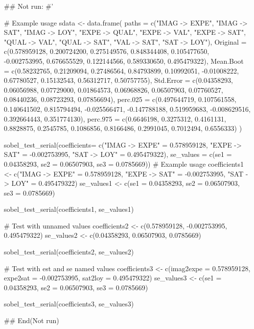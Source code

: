 \documentclass[a4paper]{book}
\begin{document}
\begin{Examples}
\begin{ExampleCode}

## Not run: 
#'

# Example usage
sdata <- data.frame(
  paths = c("IMAG -> EXPE", "IMAG -> SAT",
              "IMAG -> LOY", "EXPE -> QUAL", "EXPE -> VAL", "EXPE -> SAT",
            "QUAL -> VAL", "QUAL -> SAT", "VAL -> SAT", "SAT -> LOY"),
  Original = c(0.578959128, 0.200724200, 0.275149576,
              0.848344408, 0.105477650, -0.002753995,
               0.676655529, 0.122144566, 0.589330650, 0.495479322),
  Mean.Boot = c(0.58232765, 0.21209094, 0.27486564,
                0.84793899, 0.10992051, -0.01008222,
                0.67780527, 0.15132543, 0.56312717, 0.50757755),
  Std.Error = c(0.04358293, 0.06056988, 0.07729000,
                 0.01864573, 0.06968826, 0.06507903,
                0.07760527, 0.08440236, 0.08723293, 0.07856694),
  perc.025 = c(0.497644719, 0.107561558, 0.140641502,
                0.815794494, -0.025566471, -0.147788188,
               0.519959683, -0.008629516, 0.392664443, 0.351774130),
  perc.975 = c(0.6646198, 0.3275312, 0.4161131,
                0.8828875, 0.2545785, 0.1086856,
               0.8166486, 0.2991045, 0.7012494, 0.6556333)
)



sobel_test_serial(coefficients= c("IMAG -> EXPE" = 0.578959128,
                                  "EXPE -> SAT" = -0.002753995,
                                  "SAT -> LOY" = 0.495479322),
                  se_values = c(se1 = 0.04358293,
                                se2 = 0.06507903,
                                se3 = 0.0785669))
# Example usage
coefficients1 <- c("IMAG -> EXPE" = 0.578959128,
                  "EXPE -> SAT" = -0.002753995, "SAT -> LOY" = 0.495479322)
se_values1 <- c(se1 = 0.04358293, se2 = 0.06507903, se3 = 0.0785669)

sobel_test_serial(coefficients1, se_values1)


# Test with unnamed values
coefficients2 <- c(0.578959128, -0.002753995, 0.495479322)
se_values2 <- c(0.04358293, 0.06507903, 0.0785669)

sobel_test_serial(coefficients2, se_values2)


# Test with est and se named values
coefficients3 <- c(imag2expe = 0.578959128,
                  expe2sat = -0.002753995, sat2loy = 0.495479322)
se_values3 <- c(se1 = 0.04358293, se2 = 0.06507903, se3 = 0.0785669)

sobel_test_serial(coefficients3, se_values3)




## End(Not run)


\end{ExampleCode}
\end{Examples}
\end{document}
